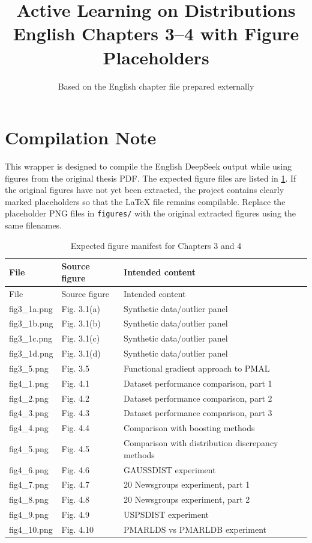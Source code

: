 \documentclass[12pt,a4paper]{report}
\title{Active Learning on Distributions\\\large English Chapters 3--4 with Figure Placeholders}
\author{Based on the English chapter file prepared externally}
\date{}
\begin{document}
\maketitle
\tableofcontents

\chapter*{Compilation Note}
This wrapper is designed to compile the English DeepSeek output while using figures from the original thesis PDF. The expected figure files are listed in \cref{tab:figure-manifest}. If the original figures have not yet been extracted, the project contains clearly marked placeholders so that the LaTeX file remains compilable. Replace the placeholder PNG files in \texttt{figures/} with the original extracted figures using the same filenames.

\begin{longtable}{lll}
\caption{Expected figure manifest for Chapters 3 and 4}\label{tab:figure-manifest}\\
\toprule
File & Source figure & Intended content \\
\midrule
\endfirsthead
\toprule
File & Source figure & Intended content \\
\midrule
\endhead
fig3\_1a.png & Fig. 3.1(a) & Synthetic data/outlier panel \\
fig3\_1b.png & Fig. 3.1(b) & Synthetic data/outlier panel \\
fig3\_1c.png & Fig. 3.1(c) & Synthetic data/outlier panel \\
fig3\_1d.png & Fig. 3.1(d) & Synthetic data/outlier panel \\
fig3\_5.png & Fig. 3.5 & Functional gradient approach to PMAL \\
fig4\_1.png & Fig. 4.1 & Dataset performance comparison, part 1 \\
fig4\_2.png & Fig. 4.2 & Dataset performance comparison, part 2 \\
fig4\_3.png & Fig. 4.3 & Dataset performance comparison, part 3 \\
fig4\_4.png & Fig. 4.4 & Comparison with boosting methods \\
fig4\_5.png & Fig. 4.5 & Comparison with distribution discrepancy methods \\
fig4\_6.png & Fig. 4.6 & GAUSSDIST experiment \\
fig4\_7.png & Fig. 4.7 & 20 Newsgroups experiment, part 1 \\
fig4\_8.png & Fig. 4.8 & 20 Newsgroups experiment, part 2 \\
fig4\_9.png & Fig. 4.9 & USPSDIST experiment \\
fig4\_10.png & Fig. 4.10 & PMARLDS vs PMARLDB experiment \\
\bottomrule
\end{longtable}
\end{document}
